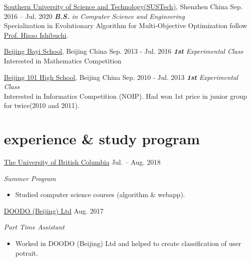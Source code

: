 \documentclass[hidelinks__VERSION__]{adamyi-cv}
\begin{document}
\begin{entrylist}


\entry
{\href{https://www.sustech.edu.cn/}{Southern University of Science and Technology(SUSTech)}, Shenzhen China}
{Sep. 2016 -- Jul. 2020}
{\emph{\textbf{B.S.} in Computer Science and Engineering}\\
Specialization in Evolutionary Algorithm for Multi-Objective Optimization follow \href{http://cse.sustc.edu.cn/en/people/view/people_id/55/sort_id/9/pid/}{Prof. Hisao Ishibuchi}.
}

\entry
{\href{http://bayims.cn/}{Beijing Bayi School}, Beijing China}
{Sep. 2013 - Jul. 2016}
{\emph{\textbf{1st} Experimental Class}\\
Interested in Mathematics Competition
}

\entry
{\href{http://beijing101.com}{Beijing 101 High School}, Beijing China}
{Sep. 2010 - Jul. 2013}
{\emph{\textbf{1st} Experimental Class}\\
Interested in Informatics Competition (NOIP). Had won 1st price in junior group for twice(2010 and 2011).
}

\end{entrylist}


\section{experience \& study program}

\begin{entrylist}


\entry
{\href{https://www.ubc.ca/}{The University of British Columbia}}
{Jul. -- Aug. 2018}
{\emph{Summer Program}
\begin{itemize}
\item Studied computer science courses (algorithm \& webapp).
\end{itemize}}


\entry
{\href{http://www.doodod.com/}{DOODO (Beijing) Ltd}}
{Aug. 2017}
{\emph{Part Time Assistant}
\begin{itemize}
\item Worked in DOODO (Beijing) Ltd and helped to create classification of user potrait.
\end{itemize}}


\end{entrylist}
\end{document}
